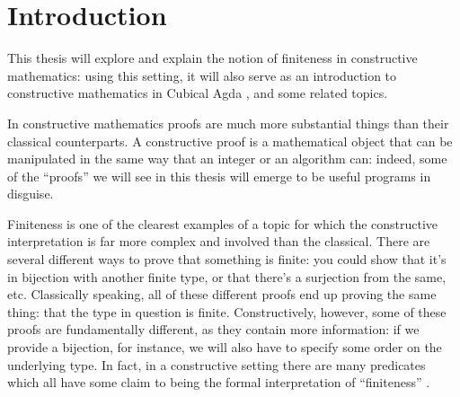 \chapter{Introduction}




This thesis will explore and explain the notion of finiteness in constructive
mathematics: using this setting, it will also serve as an introduction to
constructive mathematics in Cubical Agda
\cite{vezzosiCubicalAgdaDependently2019}, and some related topics.

In constructive mathematics proofs are much more substantial things than their
classical counterparts.
A constructive proof is a mathematical object that can be manipulated in the
same way that an integer or an algorithm can: indeed, some of the ``proofs'' we
will see in this thesis will emerge to be useful programs in disguise.

Finiteness is one of the clearest examples of a topic for which the constructive
interpretation is far more complex and involved than the classical.
There are several different ways to prove that something is finite: you could
show that it's in bijection with another finite type, or that there's a
surjection from the same, etc.
Classically speaking, all of these different proofs end up proving the same
thing: that the type in question is finite.
Constructively, however, some of these proofs are fundamentally different, as
they contain more information: if we provide a bijection, for instance, we will
also have to specify some order on the underlying type. 
In fact, in a constructive setting there are many predicates which all have some
claim to being the formal interpretation of ``finiteness''
\cite{coquandConstructivelyFinite2010}.

